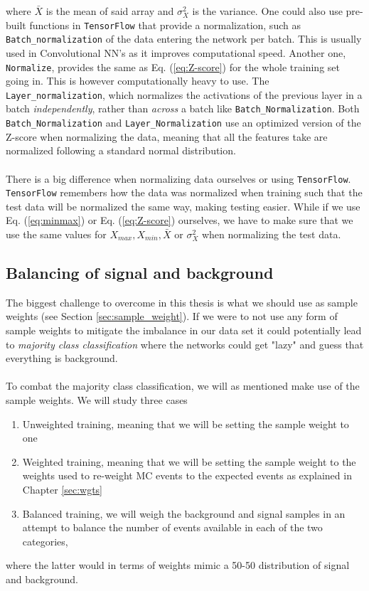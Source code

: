\documentclass[12pt, a4paper]{book}
\begin{document}
where $\bar{X}$ is the mean of said array and $\sigma_X^2$ is the variance. One could also use pre-built functions in \verb|TensorFlow| that provide a normalization, such as \verb|Batch_normalization| of the data entering the network per batch. This is usually used 
in Convolutional NN's as it improves computational speed. Another one, \verb|Normalize|, provides the same as Eq. (\ref{eq:Z-score}) for the whole training set going in. This is however computationally heavy to use. The \verb|Layer_normalization|, which normalizes the activations 
of the previous layer in a batch \textit{independently}, rather than \textit{across} a batch like \verb|Batch_Normalization|. Both \verb|Batch_Normalization| and \verb|Layer_Normalization| use an optimized version of the Z-score when normalizing the data, meaning that all the features 
take are normalized following a standard normal distribution.\\
\\There is a big difference when normalizing data ourselves or using \verb|TensorFlow|. \verb|TensorFlow| remembers how the data was normalized when training such that the test data will be normalized the same way, making testing easier. While if we use Eq. (\ref{eq:minmax}) or 
Eq. (\ref{eq:Z-score}) ourselves, we have to make sure that we use the same values for $X_{max}, X_{min}, \bar{X}$ or $\sigma_X^2$ when normalizing the test data. 



\subsection{Balancing of signal and background}\label{sec:balance_NN}
The biggest challenge to overcome in this thesis is what we should use as sample weights (see Section \ref{sec:sample_weight}). If we were to not use any form of sample weights to mitigate the imbalance in our data set it could potentially lead to \textit{majority class classification} where the 
networks could get "lazy" and guess that everything is background. \\
\\To combat the majority class classification, we will as mentioned make use of the sample weights. We will study three cases
\begin{enumerate}
   \item Unweighted training, meaning that we will be setting the sample weight to one
   \item Weighted training, meaning that we will be setting the sample weight to the weights used to re-weight MC events to the expected events as explained in Chapter \ref{sec:wgts}
   \item Balanced training, we will weigh the background and signal samples in an attempt to balance the number of events available in each of the two categories,
\end{enumerate}
where the latter would in terms of weights mimic a 50-50 distribution of signal and background. 
\end{document}
